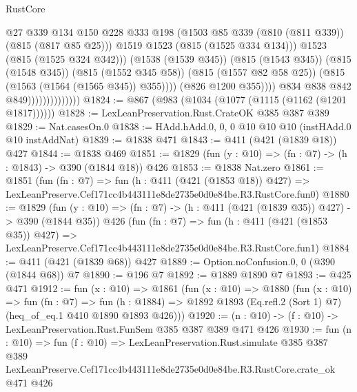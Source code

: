 \begin{lexlean}{RustCore}
\begin{coremodule}
                                              @27
                                              @339
                                              @134
                                              @150
                                              @228
                                              @333
                                              @198
                                              (@1503
                                                @85
                                                @339
                                                (@810 (@811 @339))
                                                (@815 (@817 @85 @25)))
                                              @1519
                                              @1523
                                              (@815 (@1525 @334 @134)))
                                            @1523
                                            (@815 (@1525 @324 @342)))
                                          (@1538 (@1539 @345))
                                          (@815 (@1543 @345))
                                          (@815 (@1548 @345))
                                          (@815 (@1552 @345 @58))
                                          (@815 (@1557 @82 @58 @25))
                                          (@815 (@1563 (@1564 (@1565 @345)) @355))))
                                      (@826 @1200 @355))))
                                @834
                                @838
                                @842
                                @849))))))))))))))
@1824 := @867 (@983 (@1034 (@1077 (@1115 (@1162 (@1201 @1817))))))
@1828 := LexLeanPreservation.Rust.CrateOK @385 @387 @389
@1829 := Nat.casesOn.{0}
@1838 := HAdd.hAdd.{0, 0, 0} @10 @10 @10 (instHAdd.{0} @10 instAddNat)
@1839 := @1838 @471
@1843 := @411 (@421 (@1839 @18)) @427
@1844 := @1838 @469
@1851 := @1829 (fun (y : @10) => (fn : @7) -> (h : @1843) -> @390 (@1844 @18)) @426
@1853 := @1838 Nat.zero
@1861 := @1851
    (fun (fn : @7) =>
    fun (h : @411 (@421 (@1853 @18)) @427) =>
    LexLeanPreserve.Cef171cc4b443111e8de2735e0d0e84be.R3.RustCore.fun0)
@1880 := @1829
    (fun (y : @10) => (fn : @7) -> (h : @411 (@421 (@1839 @35)) @427) -> @390 (@1844 @35))
    @426
    (fun (fn : @7) =>
    fun (h : @411 (@421 (@1853 @35)) @427) =>
    LexLeanPreserve.Cef171cc4b443111e8de2735e0d0e84be.R3.RustCore.fun1)
@1884 := @411 (@421 (@1839 @68)) @427
@1889 := Option.noConfusion.{0, 0} (@390 (@1844 @68)) @7
@1890 := @196 @7
@1892 := @1889 @1890 @7
@1893 := @425 @471
@1912 := fun (x : @10) =>
  @1861
    (fun (x : @10) =>
    @1880
      (fun (x : @10) =>
      fun (fn : @7) =>
      fun (h : @1884) =>
      @1892 @1893 (Eq.refl.{2} (Sort 1) @7) (heq_of_eq.{1} @410 @1890 @1893 @426)))
@1920 := (n : @10) -> (f : @10) -> LexLeanPreservation.Rust.FunSem @385 @387 @389 @471 @426
@1930 := fun (n : @10) =>
  fun (f : @10) =>
  LexLeanPreservation.Rust.simulate
    @385
    @387
    @389
    LexLeanPreserve.Cef171cc4b443111e8de2735e0d0e84be.R3.RustCore.crate_ok
    @471
    @426
\end{coremodule}
\end{lexlean}
